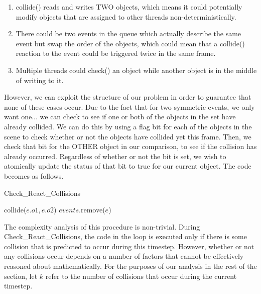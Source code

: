 \documentclass[CEJCS,PDF]{cej} %
\begin{document}
\begin{enumerate}
	\item collide() reads and writes TWO objects, which means it could potentially modify objects that are assigned to other threads non-deterministically.
	\item There could be two events in the queue which actually describe the same event but swap the order of the objects, which could mean that a collide() reaction to the event could be triggered twice in the same frame.
	\item Multiple threads could check() an object while another object is in the middle of writing to it.
\end{enumerate}

However, we can exploit the structure of our problem in order to guarantee that none of these cases occur.  Due to the fact that for two symmetric events, we only want one... we can check to see if one or both of the objects in the set have already collided.
We can do this by using a flag bit for each of the objects in the scene to check whether or not the objects have collided yet this frame.  Then, we check
that bit for the OTHER object in our comparison, to see if the collision has already occurred.  Regardless of whether or not the bit is set, we wish to atomically
update the status of that bit to true for our current object.  The code becomes as follows.

\begin{algorithm}
\caption{Check\_React\_Collisions}
\begin{algorithmic}
\STATE {}
	\STATE {}
		\STATE {}
			\STATE {}
			\STATE collide($e.o1,e.o2$)
		\ENDIF
		\STATE {}
		\STATE $events$.remove($e$)
	\ENDIF
\ENDFOR
\end{algorithmic}
\end{algorithm}

The complexity analysis of this procedure is non-trivial.  During Check\_React\_Collisions, the code in the loop is executed only if there is 
some collision that is predicted to occur during this timestep.  However, whether or not any collisions occur depends on a number of factors that
cannot be effectively reasoned about mathematically. For the purposes of our analysis in the rest of the section, let $k$ refer to the number 
of collisions that occur during the current timestep.  
\end{document}
